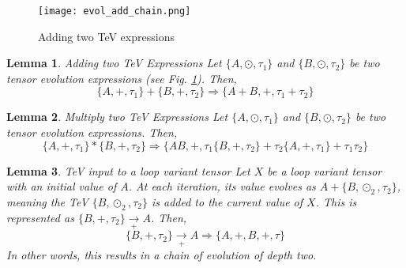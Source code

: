 \documentclass{article}
\newtheorem{lemma}{Lemma}
\begin{document}
    \begin{figure}[h!]
    \centering
      \texttt{[image: evol\_add\_chain.png]}
      \caption{Adding two TeV expressions}
      \label{fig::evol_add_chain}
    \end{figure}
    

    
    \begin{lemma}{Adding two TeV Expressions}
    \label{lem::evol_add_chain}
    \newline Let $\{A,\odot,\tau_1\}$ and $\{B,\odot,\tau_2\}$ be two tensor evolution expressions (see Fig. \ref{fig::evol_add_chain}). Then, 
    \[
    \{A, +, \tau_1 \} + \{B, +, \tau_2\} \Rightarrow \{A+B, +, \tau_1 + \tau_2\}
    \]
    \end{lemma}
    
    
    \begin{lemma}{Multiply two TeV Expressions}
    \label{lem::evol_mul_chain}
    \newline Let $\{A,\odot,\tau_1\}$ and $\{B,\odot,\tau_2\}$ be two tensor evolution expressions. Then, 
    \[
    \{A, +, \tau_1 \} * \{B, +, \tau_2\} \Rightarrow \big\{AB, +, \tau_1\{B, +, \tau_2\} + \tau_2\{A, +, \tau_1 \} + \tau_1\tau_2\big\}
    \]
    \end{lemma}
    
   
    \begin{lemma}{TeV input to a loop variant tensor}
    \label{lem::evol_mem_chain}
    \newline Let $X$ be a loop variant tensor with an initial value of $A$. At each iteration,
     its value evolves as $A + \{B,\odot_2,\tau_2\}$, meaning the TeV $\{B,\odot_2,\tau_2\}$ is 
     added to the current value of $X$. This is represented as 
    $\{B, +, \tau_2\} \xrightarrow[+]{} A$. Then,
    \newline
    \[
    \{B, +, \tau_2\} \xrightarrow[+]{} A \Rightarrow \{A, +, B, +, \tau\}
    \]
    In other words, this results in a chain of evolution of depth two.
    \end{lemma}
    
\end{document}
